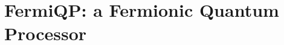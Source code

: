 \newcommand{\imagepath}{../20-fermiqp/img}

\chapter{FermiQP: a Fermionic Quantum Processor}


\printbibliography
